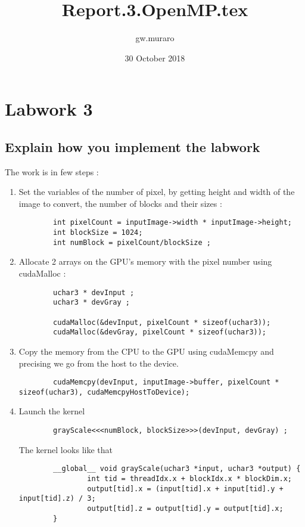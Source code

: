 \documentclass{article}
\title{Report.3.OpenMP.tex}
\author{gw.muraro }
\date{30 October 2018}
\begin{document}
\maketitle
\section{Labwork 3}
\subsection{Explain how you implement the labwork}

    The work is in few steps : 
    \begin{enumerate}
        \item Set the variables of the number of pixel, by getting height and width of the image to convert, the number of blocks and their sizes :
        \begin{verbatim}
        int pixelCount = inputImage->width * inputImage->height;
        int blockSize = 1024;
        int numBlock = pixelCount/blockSize ;
        \end{verbatim}
        
        \item Allocate 2 arrays on the GPU's memory with the pixel number using cudaMalloc :
        \begin{verbatim}
        uchar3 * devInput ;
        uchar3 * devGray ;

        cudaMalloc(&devInput, pixelCount * sizeof(uchar3));
        cudaMalloc(&devGray, pixelCount * sizeof(uchar3));    
        \end{verbatim}
        
        
        \item Copy the memory from the CPU to the GPU using cudaMemcpy and precising we go from the host to the device. 
        \begin{verbatim}
        cudaMemcpy(devInput, inputImage->buffer, pixelCount * sizeof(uchar3), cudaMemcpyHostToDevice);
        \end{verbatim}
        
        
        \item Launch the kernel 
        \begin{verbatim}
        grayScale<<<numBlock, blockSize>>>(devInput, devGray) ;
        \end{verbatim}
        
        The kernel looks like that
        \begin{verbatim}
        __global__ void grayScale(uchar3 *input, uchar3 *output) {
                int tid = threadIdx.x + blockIdx.x * blockDim.x;
                output[tid].x = (input[tid].x + input[tid].y + input[tid].z) / 3;
                output[tid].z = output[tid].y = output[tid].x;
        }
    

\end{verbatim}
\end{enumerate}
\end{document}
